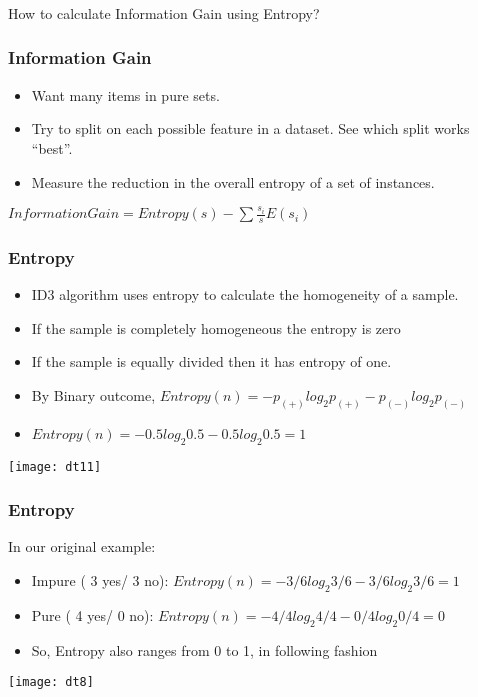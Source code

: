 \begin{frame}[fragile]\frametitle{}
\begin{center}
{\Large How to calculate Information Gain using Entropy?}
\end{center}
\end{frame}

\begin{frame}[fragile]\frametitle{Information Gain}
\begin{itemize}
\item Want many items in pure sets.
\item Try to split on each possible feature in a dataset. See which split works ``best''.
\item Measure the reduction in the overall entropy of a set of instances.
\end{itemize}
$InformationGain = Entropy(s) - \sum \frac{s_i}{s} E(s_i)$
\end{frame}


\begin{frame}[fragile]\frametitle{Entropy}
\begin{itemize}
\item ID3 algorithm uses entropy to calculate the homogeneity of a sample. 
\item If the sample is completely homogeneous the entropy is zero 
\item If the sample is equally divided then it has entropy of one.
\item By Binary outcome, $Entropy(n) = - p_{(+)} log_2 p_{(+)} - p_{(-)} log_2 p_{(-)}$
\item $Entropy(n) = - 0.5 log_2 0.5 - 0.5 log_2 0.5 = 1$
\end{itemize}
\begin{center}
\texttt{[image: dt11]}
\end{center}
\end{frame}


\begin{frame}[fragile]\frametitle{Entropy}
In our original example:
\begin{itemize}
\item Impure ( 3 yes/ 3 no): $Entropy(n) = - 3/6  log_2 3/6 - 3/6 log_2 3/6 = 1$
\item Pure ( 4 yes/ 0 no): $Entropy(n) = - 4/4  log_2 4/4 - 0/4 log_2 0/4 = 0$
\item So, Entropy also ranges from 0 to 1, in following fashion
\end{itemize}
\begin{center}
\texttt{[image: dt8]}
\end{center}
\end{frame}


